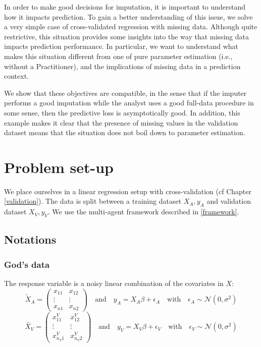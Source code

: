 In order to make good decisions for imputation, it is important to understand how it impacts prediction. To gain a better understanding of this issue, we solve a very simple case of cross-validated regression with missing data. Although quite restrictive, this situation provides some insights into the way that missing data impacts prediction performance. In particular, we want to understand what makes this situation different from one of pure parameter estimation (i.e., without a Practitioner), and the implications of missing data in a prediction context.

 We show that these objectives are compatible, in the sense that if the imputer performs a good imputation while the analyst uses a good full-data procedure in some sense, then the predictive loss is asymptotically good. In addition, this example makes it clear that the presence of missing values in the validation dataset means that the situation does not boil down to parameter estimation.

	\section{Problem set-up}
We place ourselves in a linear regression setup with cross-validation (cf Chapter \ref{validation}). The data is split between a training dataset $X_A, y_A$ and validation dataset $X_V, y_V$. We use the multi-agent framework described in \ref{framework}.
		\subsection{Notations}
			\subsubsection{God's data}
The response variable is a noisy linear combination of the covariates in $X$:
\begin{equation*}
\tilde{X}_A = 
\begin{pmatrix}
x_{11} & x_{12} \\
\vdots & \vdots \\
x_{n1} & x_{n2}
\end{pmatrix}
\quad \mathrm{and} \quad
y_A = X_A \beta + \epsilon_A
\quad \mathrm{with} \quad
\epsilon_A \sim \mathcal{N}(0, \sigma^2)
\end{equation*}
\begin{equation*}
\tilde{X_V} = 
\begin{pmatrix}
x_{11}^V & x_{12}^V \\
\vdots & \vdots \\
x_{n_V1}^V & x_{n_V2}^V
\end{pmatrix}
\quad \mathrm{and} \quad
y_V = X_V \beta + \epsilon_V
\quad \mathrm{with} \quad
\epsilon_V \sim \mathcal{N}(0, \sigma^2)
\end{equation*}


